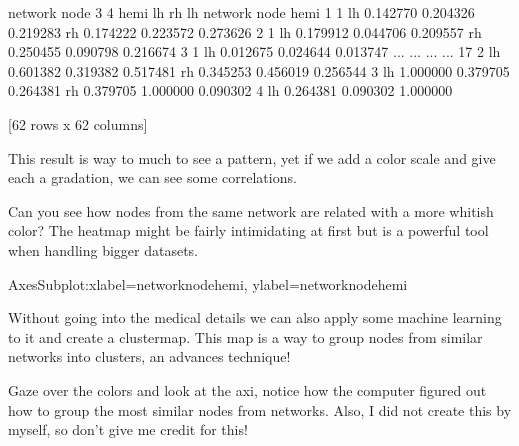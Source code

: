 \documentclass[letterpaper,10pt,english]{jupyterBook}
\begin{document}
\begin{sphinxVerbatim}[commandchars=\\\{\}]
network                                          
node                      3                   4  
hemi                     lh        rh        lh  
network node hemi                                
1       1    lh   \PYGZhy{}0.142770 \PYGZhy{}0.204326 \PYGZhy{}0.219283  
             rh   \PYGZhy{}0.174222 \PYGZhy{}0.223572 \PYGZhy{}0.273626  
2       1    lh   \PYGZhy{}0.179912 \PYGZhy{}0.044706 \PYGZhy{}0.209557  
             rh   \PYGZhy{}0.250455 \PYGZhy{}0.090798 \PYGZhy{}0.216674  
3       1    lh   \PYGZhy{}0.012675 \PYGZhy{}0.024644  0.013747  
...                     ...       ...       ...  
17      2    lh    0.601382  0.319382  0.517481  
             rh    0.345253  0.456019  0.256544  
        3    lh    1.000000  0.379705  0.264381  
             rh    0.379705  1.000000  0.090302  
        4    lh    0.264381  0.090302  1.000000  

[62 rows x 62 columns]
\end{sphinxVerbatim}

\sphinxAtStartPar
This result is way to much to see a pattern, yet if we add a color scale and give each a gradation, we can see some correlations.

\sphinxAtStartPar
Can you see how nodes from the same network are related with a more whitish color?
The heatmap might be fairly intimidating at first but is a powerful tool when handling bigger datasets.

\begin{sphinxVerbatim}[commandchars=\\\{\}]
\end{sphinxVerbatim}

\begin{sphinxVerbatim}[commandchars=\\\{\}]
\PYGZlt{}AxesSubplot:xlabel=\PYGZsq{}network\PYGZhy{}node\PYGZhy{}hemi\PYGZsq{}, ylabel=\PYGZsq{}network\PYGZhy{}node\PYGZhy{}hemi\PYGZsq{}\PYGZgt{}
\end{sphinxVerbatim}

\noindent{}

\sphinxAtStartPar
Without going into the medical details we can also apply some machine learning to it and create a clustermap.
This map is a way to group nodes from similar networks into clusters, an advances technique!

\sphinxAtStartPar
Gaze over the colors and look at the axi, notice how the computer figured out how to group the most similar nodes from networks.
Also, I did not create this by myself, so don’t give me credit for this!
\end{document}
